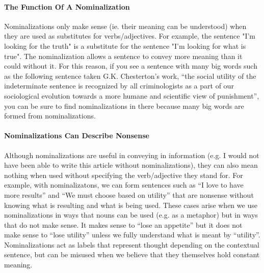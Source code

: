\documentclass[a4paper, 12pt]{article}
\begin{document}
\paragraph{The Function Of A Nominalization}
Nominalizations only make sense (ie. their meaning can be understood) when they are used as substitutes for verbs/adjectives. For example, the sentence "I'm looking for the truth" is a substitute for the sentence "I'm looking for what is true". The nominalization allows a sentence to convey more meaning than it could without it. For this reason, if you see a sentence with many big words such as the following sentence taken G.K. Chesterton's work, ``the social utility of the indeterminate sentence is recognized by all criminologists as a part of our sociological evolution towards a more humane and scientific view of punishment'', you can be sure to find nominalizations in there because many big words are formed from nominalizations.
\paragraph{Nominalizations Can Describe Nonsense}
Although nominalizations are useful in conveying in information (e.g. I would not have been able to write this article without nominalizations), they can also mean nothing when used without specifying the verb/adjective they stand for. For example, with nominalizatons, we can form sentences such as ``I love to have more results'' and ``We must choose based on utility'' that are nonsense without knowing what is resulting and what is being used. These cases arise when we use nominalizations in ways that nouns can be used (e.g. as a metaphor) but in ways that do not make sense. It makes sense to ``lose an appetite'' but it does not make sense to ``lose utility'' unless we fully understand what is meant by ``utility''. Nominalizations act as labels that represent thought depending on the contextual sentence, but can be misused when we believe that they themselves hold constant meaning.
\end{document}

